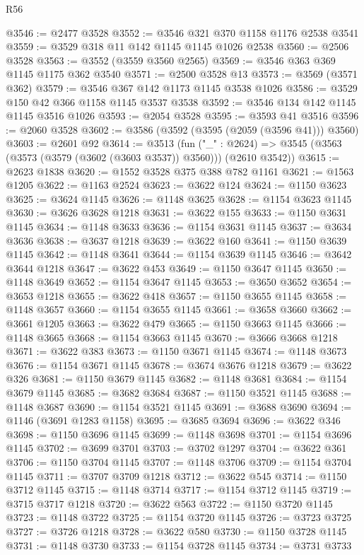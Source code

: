 \begin{lexlean}{R56}
\begin{coremodule}
@3546 := @2477 @3528
@3552 := @3546 @321 @370 @1158 @1176 @2538 @3541
@3559 := @3529 @318 @11 @142 @1145 @1145 @1026 @2538
@3560 := @2506 @3528
@3563 := @3552 (@3559 @3560 @2565)
@3569 := @3546 @363 @369 @1145 @1175 @362 @3540
@3571 := @2500 @3528 @13
@3573 := @3569 (@3571 @362)
@3579 := @3546 @367 @142 @1173 @1145 @3538 @1026
@3586 := @3529 @150 @42 @366 @1158 @1145 @3537 @3538
@3592 := @3546 @134 @142 @1145 @1145 @3516 @1026
@3593 := @2054 @3528
@3595 := @3593 @41 @3516
@3596 := @2060 @3528
@3602 := @3586 (@3592 (@3595 (@2059 (@3596 @41))) @3560)
@3603 := @2601 @92
@3614 := @3513
    (fun ("_" : @2624) => @3545 (@3563 (@3573 (@3579 (@3602 (@3603 @3537)) @3560))) (@2610 @3542))
@3615 := @2623 @1838
@3620 := @1552 @3528 @375 @388 @782 @1161
@3621 := @1563 @1205
@3622 := @1163 @2524
@3623 := @3622 @124
@3624 := @1150 @3623
@3625 := @3624 @1145
@3626 := @1148 @3625
@3628 := @1154 @3623 @1145
@3630 := @3626 @3628 @1218
@3631 := @3622 @155
@3633 := @1150 @3631 @1145
@3634 := @1148 @3633
@3636 := @1154 @3631 @1145
@3637 := @3634 @3636
@3638 := @3637 @1218
@3639 := @3622 @160
@3641 := @1150 @3639 @1145
@3642 := @1148 @3641
@3644 := @1154 @3639 @1145
@3646 := @3642 @3644 @1218
@3647 := @3622 @453
@3649 := @1150 @3647 @1145
@3650 := @1148 @3649
@3652 := @1154 @3647 @1145
@3653 := @3650 @3652
@3654 := @3653 @1218
@3655 := @3622 @418
@3657 := @1150 @3655 @1145
@3658 := @1148 @3657
@3660 := @1154 @3655 @1145
@3661 := @3658 @3660
@3662 := @3661 @1205
@3663 := @3622 @479
@3665 := @1150 @3663 @1145
@3666 := @1148 @3665
@3668 := @1154 @3663 @1145
@3670 := @3666 @3668 @1218
@3671 := @3622 @383
@3673 := @1150 @3671 @1145
@3674 := @1148 @3673
@3676 := @1154 @3671 @1145
@3678 := @3674 @3676 @1218
@3679 := @3622 @326
@3681 := @1150 @3679 @1145
@3682 := @1148 @3681
@3684 := @1154 @3679 @1145
@3685 := @3682 @3684
@3687 := @1150 @3521 @1145
@3688 := @1148 @3687
@3690 := @1154 @3521 @1145
@3691 := @3688 @3690
@3694 := @1146 (@3691 @1283 @1158)
@3695 := @3685 @3694
@3696 := @3622 @346
@3698 := @1150 @3696 @1145
@3699 := @1148 @3698
@3701 := @1154 @3696 @1145
@3702 := @3699 @3701
@3703 := @3702 @1297
@3704 := @3622 @361
@3706 := @1150 @3704 @1145
@3707 := @1148 @3706
@3709 := @1154 @3704 @1145
@3711 := @3707 @3709 @1218
@3712 := @3622 @545
@3714 := @1150 @3712 @1145
@3715 := @1148 @3714
@3717 := @1154 @3712 @1145
@3719 := @3715 @3717 @1218
@3720 := @3622 @563
@3722 := @1150 @3720 @1145
@3723 := @1148 @3722
@3725 := @1154 @3720 @1145
@3726 := @3723 @3725
@3727 := @3726 @1218
@3728 := @3622 @580
@3730 := @1150 @3728 @1145
@3731 := @1148 @3730
@3733 := @1154 @3728 @1145
@3734 := @3731 @3733

\end{coremodule}
\end{lexlean}

